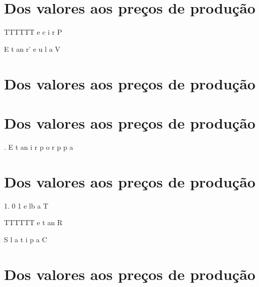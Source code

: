 \section{Dos valores aos preços de produção}
 \par 
TTTTTT e c i r P
 \par 
E t an r' e u l a V
 \par 
\section{Dos valores aos preços de produção}
 \par 
\section{Dos valores aos preços de produção}
 \par 
. E t an i r p o r p p a
 \par 
\section{Dos valores aos preços de produção}
 \par 
1. {\color{blue}0} 1 e lb a T
 \par 
TTTTTT e t an R
 \par 
S l a t i p a C
 \par 
\section{Dos valores aos preços de produção}
 \par 
